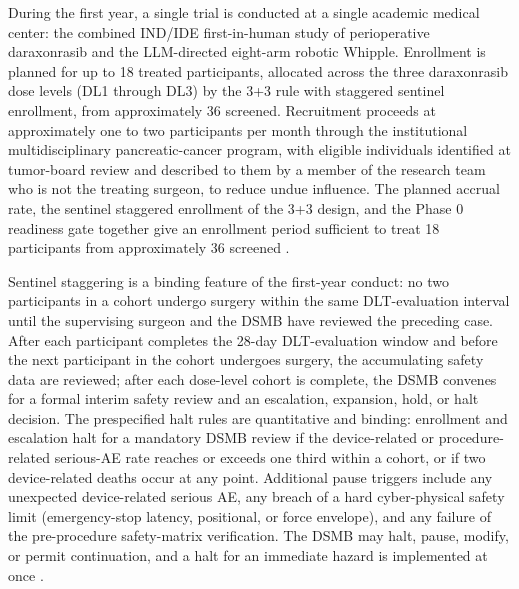 During the first year, a single trial is conducted at a single academic medical
center: the combined IND/IDE first-in-human study of perioperative daraxonrasib and
the LLM-directed eight-arm robotic Whipple. Enrollment is planned for up to 18
treated participants, allocated across the three daraxonrasib dose levels (DL1
through DL3) by the 3+3 rule with staggered sentinel enrollment, from approximately
36 screened. Recruitment proceeds at approximately one to two participants per month
through the institutional multidisciplinary pancreatic-cancer program, with eligible
individuals identified at tumor-board review and described to them by a member of the
research team who is not the treating surgeon, to reduce undue influence. The planned
accrual rate, the sentinel staggered enrollment of the 3+3 design, and the Phase 0
readiness gate together give an enrollment period sufficient to treat 18 participants
from approximately 36 screened \cite{daraxwhipple,phase1guidance}.

Sentinel staggering is a binding feature of the first-year conduct: no two
participants in a cohort undergo surgery within the same DLT-evaluation interval
until the supervising surgeon and the DSMB have reviewed the preceding case. After
each participant completes the 28-day DLT-evaluation window and before the next
participant in the cohort undergoes surgery, the accumulating safety data are
reviewed; after each dose-level cohort is complete, the DSMB convenes for a formal
interim safety review and an escalation, expansion, hold, or halt decision. The
prespecified halt rules are quantitative and binding: enrollment and escalation halt
for a mandatory DSMB review if the device-related or procedure-related serious-AE
rate reaches or exceeds one third within a cohort, or if two device-related deaths
occur at any point. Additional pause triggers include any unexpected device-related
serious AE, any breach of a hard cyber-physical safety limit (emergency-stop
latency, positional, or force envelope), and any failure of the pre-procedure
safety-matrix verification. The DSMB may halt, pause, modify, or permit continuation,
and a halt for an immediate hazard is implemented at once \cite{daraxwhipple}.

